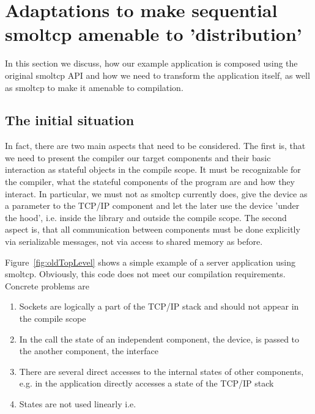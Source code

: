 \section{Adaptations to make sequential smoltcp amenable to 'distribution'}

In this section we discuss, how our example application is composed using the original smoltcp API and how we need to transform the application itself, as well as smoltcp to make it amenable to compilation. 


\subsection{The initial situation}
In fact, there are two main aspects that need to be considered. The first is, that we need to present the compiler our target components and their basic interaction as stateful objects in the compile scope. It must be recognizable for the compiler, what the stateful components of the program are and how they interact. In particular, we must not as smoltcp currently does, give the device as a parameter to the TCP/IP component and let the later use the device 'under the hood', i.e. inside the library and outside the compile scope. The second aspect is, that all communication between components must be done explicitly via serializable messages, not via access to shared memory as before.

Figure~\ref{fig:oldTopLevel} shows a simple example of a server application using smoltcp. Obviously, this code does not meet our compilation requirements. Concrete problems are 
\begin{enumerate}
    \item Sockets are logically a part of the TCP/IP stack and should not appear in the compile scope
    \item In the call  the state of an independent component, the device, is passed to the another component, the interface
    \item There are several direct accesses to the internal states of other components, e.g. in  the application directly accesses a state of the TCP/IP stack
    \item States are not used linearly i.e.  
\end{enumerate}


